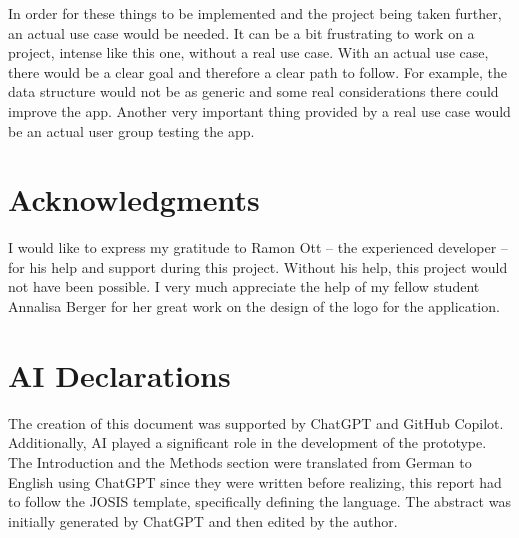 \documentclass{josis}
\begin{document}
In order for these things to be implemented and the project being taken further, an actual use case would be needed.
It can be a bit frustrating to work on a project, intense like this one, without a real use case.
With an actual use case, there would be a clear goal and therefore a clear path to follow. For example, the
data structure would not be as generic and some real considerations there could improve the app.
Another very important thing provided by a real use case would be an actual user group testing the app.

\section*{Acknowledgments}

I would like to express my gratitude to Ramon Ott -- the experienced developer -- for his help and support during this project. 
Without his help, this project would not have been possible.
I very much appreciate the help of my fellow student Annalisa Berger for her great work on the design of the logo for the application.

\section*{AI Declarations}

The creation of this document was supported by ChatGPT and GitHub Copilot. 
Additionally, AI played a significant role in the development of the prototype.
The Introduction and the Methods section were translated from German to English using
ChatGPT since they were written before realizing, this report had to follow the JOSIS template,
specifically defining the language. The abstract was initially generated by ChatGPT
and then edited by the author.



\end{document}
